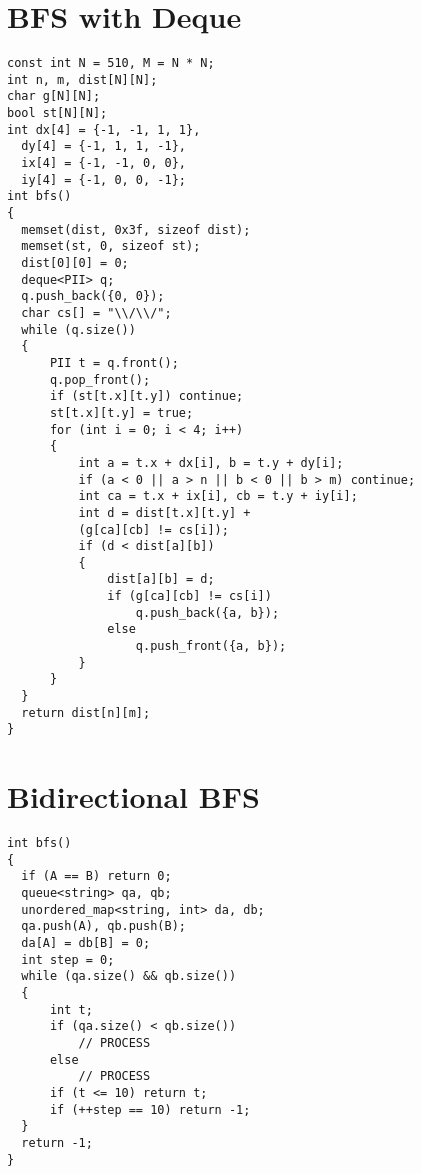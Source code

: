 \section{BFS with Deque}
\begin{lstlisting}
const int N = 510, M = N * N;
int n, m, dist[N][N];
char g[N][N];
bool st[N][N];
int dx[4] = {-1, -1, 1, 1}, 
  dy[4] = {-1, 1, 1, -1}, 
  ix[4] = {-1, -1, 0, 0}, 
  iy[4] = {-1, 0, 0, -1};
int bfs()
{
  memset(dist, 0x3f, sizeof dist);
  memset(st, 0, sizeof st);
  dist[0][0] = 0;
  deque<PII> q;
  q.push_back({0, 0});
  char cs[] = "\\/\\/";
  while (q.size())
  {
      PII t = q.front();
      q.pop_front();
      if (st[t.x][t.y]) continue;
      st[t.x][t.y] = true;
      for (int i = 0; i < 4; i++)
      {
          int a = t.x + dx[i], b = t.y + dy[i];
          if (a < 0 || a > n || b < 0 || b > m) continue;
          int ca = t.x + ix[i], cb = t.y + iy[i];
          int d = dist[t.x][t.y] + 
          (g[ca][cb] != cs[i]);
          if (d < dist[a][b])
          {
              dist[a][b] = d;
              if (g[ca][cb] != cs[i])
                  q.push_back({a, b});
              else
                  q.push_front({a, b});
          }
      }
  }
  return dist[n][m];
}
\end{lstlisting}
\section{Bidirectional BFS}
\begin{lstlisting}
int bfs()
{
  if (A == B) return 0;
  queue<string> qa, qb;
  unordered_map<string, int> da, db;
  qa.push(A), qb.push(B);
  da[A] = db[B] = 0;
  int step = 0;
  while (qa.size() && qb.size())
  {
      int t;
      if (qa.size() < qb.size())
          // PROCESS
      else 
          // PROCESS
      if (t <= 10) return t;
      if (++step == 10) return -1;
  }
  return -1;
}
\end{lstlisting}
